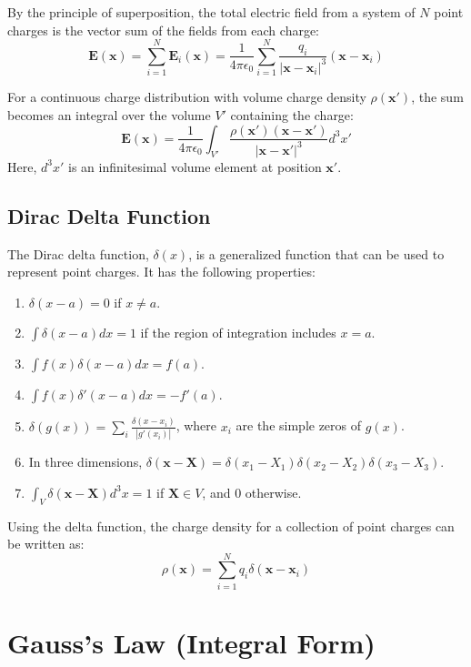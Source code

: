 \documentclass[12pt, a4paper]{article}
\begin{document}
	By the principle of superposition, the total electric field from a system of $N$ point charges is the vector sum of the fields from each charge:
	\begin{equation}
		\bm{E}(\bm{x}) = \sum_{i=1}^{N} \bm{E}_i(\bm{x}) = \frac{1}{4\pi\epsilon_0} \sum_{i=1}^{N} \frac{q_i}{|\bm{x} - \bm{x}_i|^3} (\bm{x} - \bm{x}_i)
	\end{equation}
	
	For a continuous charge distribution with volume charge density $\rho(\bm{x}')$, the sum becomes an integral over the volume $V'$ containing the charge:
	\begin{equation}
		\bm{E}(\bm{x}) = \frac{1}{4\pi\epsilon_0} \int_{V'} \frac{\rho(\bm{x}')(\bm{x} - \bm{x}')}{|\bm{x} - \bm{x}'|^3} d^3x'
	\end{equation}
	Here, $d^3x'$ is an infinitesimal volume element at position $\bm{x}'$.
	
	\subsection{Dirac Delta Function}
	The Dirac delta function, $\delta(x)$, is a generalized function that can be used to represent point charges. It has the following properties:
	\begin{enumerate}
		\item $\delta(x-a) = 0$ if $x \neq a$.
		\item $\int \delta(x-a) dx = 1$ if the region of integration includes $x=a$.
		\item $\int f(x) \delta(x-a) dx = f(a)$.
		\item $\int f(x) \delta'(x-a) dx = -f'(a)$.
		\item $\delta(g(x)) = \sum_i \frac{\delta(x-x_i)}{|g'(x_i)|}$, where $x_i$ are the simple zeros of $g(x)$.
		\item In three dimensions, $\delta(\bm{x}-\bm{X}) = \delta(x_1-X_1)\delta(x_2-X_2)\delta(x_3-X_3)$.
		\item $\int_V \delta(\bm{x}-\bm{X}) d^3x = 1$ if $\bm{X} \in V$, and $0$ otherwise.
	\end{enumerate}
	Using the delta function, the charge density for a collection of point charges can be written as:
	\begin{equation}
		\rho(\bm{x}) = \sum_{i=1}^{N} q_i \delta(\bm{x} - \bm{x}_i)
	\end{equation}
	
	\section{Gauss's Law (Integral Form)}
	
\end{document}
